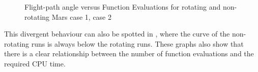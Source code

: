 \begin{figure}[H]
\centering
{} 
\caption{Flight-path angle versus Function Evaluations for rotating and non-rotating Mars \protect{} case 1,  \protect{} case 2 } 
\label{fig:FPAvsFunctionEvaluationsCase1combined} 
\end{figure}

\noindent
This divergent behaviour can also be spotted in , where the curve of the non-rotating runs is always below the rotating runs. These graphs also show that there is a clear relationship between the number of function evaluations and the required CPU time. 

